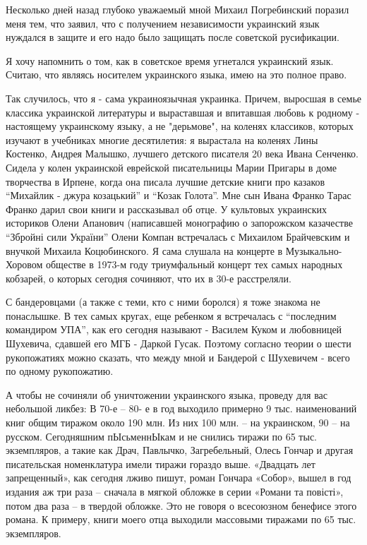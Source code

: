  
 
 
 
 

Несколько дней назад глубоко уважаемый мной Михаил Погребинский поразил меня
тем, что заявил, что с получением независимости украинский язык нуждался в
защите и его надо было защищать после советской русификации.

Я хочу напомнить о том, как в советское время угнетался украинский язык.
Считаю, что являясь носителем украинского языка, имею на это полное право.

 
Так случилось, что я - сама украиноязычная украинка. Причем, выросшая в семье
классика украинской литературы и выраставшая и впитавшая любовь к родному -
настоящему украинскому языку, а не "дерьмове", на коленях классиков, которых
изучают в учебниках многие десятилетия: я вырастала на коленях Лины Костенко,
Андрея Малышко, лучшего детского писателя 20 века Ивана Сенченко. Сидела у
колен украинской еврейской писательницы Марии Пригары в доме творчества в
Ирпене, когда она писала лучшие детские книги про казаков \enquote{Михайлик - джура
козацький} и \enquote{Козак Голота}. Мне сын Ивана Франко Тарас Франко дарил свои книги
и рассказывал об отце. У культовых украинских историков Олени Апанович
(написавшей монографию о запорожском казачестве \enquote{Збройні сили України} Олени
Компан встречалась с Михаилом Брайчевским и внучкой Михаила Коцюбинского. Я
сама слушала на концерте в Музыкально-Хоровом обществе в 1973-м году
триумфальный концерт тех самых народных кобзарей, о которых сегодня сочиняют,
что их в 30-е расстреляли.

С бандеровцами (а также с теми, кто с ними боролся) я тоже знакома не
понаслышке. В тех самых кругах, еще ребенком я встречалась с \enquote{последним
командиром УПА}, как его сегодня называют - Василем Куком и любовницей
Шухевича, сдавшей его МГБ - Даркой Гусак. Поэтому согласно теории о шести
рукопожатиях можно сказать, что между мной и Бандерой с Шухевичем - всего по
одному рукопожатию.

А чтобы  не сочиняли об уничтожении украинского языка, проведу для вас
небольшой ликбез: В 70-е – 80- е в год выходило примерно 9 тыс. наименований
книг общим тиражом около 190 млн. Из них 100 млн. – на украинском, 90 – на
русском. Сегодняшним пЫсьменнЫкам и не снились тиражи по 65 тыс. экземпляров,
а такие как Драч, Павлычко, Загребельный, Олесь Гончар и другая писательская
номенклатура имели тиражи гораздо выше. «Двадцать лет запрещенный», как
сегодня лживо пишут, роман Гончара «Собор», вышел в год издания аж три раза –
сначала в мягкой обложке в серии «Романи та повісті», потом два раза – в
твердой обложке. Это не говоря о всесоюзном бенефисе этого романа. К примеру,
книги моего отца выходили массовыми тиражами по 65 тыс. экземпляров.

